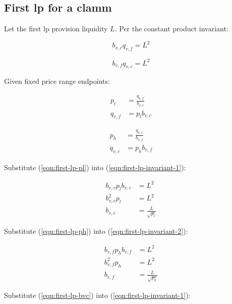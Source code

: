 \documentclass[table, twocolumn]{article}
\begin{document}
\subsection{First \gls{lp} for a \gls{clamm}} \label{sec:first-lp-clamm-derivations}

Let the first \gls{lp} provision liquidity $L$. Per the constant product invariant:

\begin{equation} \label{eqn:first-lp-invariant-1}
  b_{v, c} q_{v, f} = L^2
\end{equation}

\begin{equation} \label{eqn:first-lp-invariant-2}
  b_{v, f} q_{v, c} = L^2
\end{equation}

Given fixed price range endpoints:

\begin{align} \label{eqn:first-lp-pl}
  p_l      & = \frac{q_{v, f}}{b_{v, c}} \nonumber \\
  q_{v, f} & = p_l b_{v, c}
\end{align}

\begin{align} \label{eqn:first-lp-ph}
  p_h      & = \frac{q_{v, c}}{b_{v, f}} \nonumber \\
  q_{v, c} & = p_h b_{v, f}
\end{align}

Substitute (\ref{eqn:first-lp-pl}) into (\ref{eqn:first-lp-invariant-1}):

\begin{align} \label{eqn:first-lp-bvc}
  b_{v, c} p_l b_{v, c} & = L^2 \nonumber        \\
  b_{v, c}^2 p_l        & = L^2 \nonumber        \\
  b_{v, c}              & = \frac{L}{\sqrt{p_l}}
\end{align}

Substitute (\ref{eqn:first-lp-ph}) into (\ref{eqn:first-lp-invariant-2}):

\begin{align} \label{eqn:first-lp-bvf}
  b_{v, f} p_h b_{v, f} & = L^2 \nonumber        \\
  b_{v, f}^2 p_h        & = L^2 \nonumber        \\
  b_{v, f}              & = \frac{L}{\sqrt{p_h}}
\end{align}

Substitute (\ref{eqn:first-lp-bvc}) into (\ref{eqn:first-lp-invariant-1}):
\end{document}
